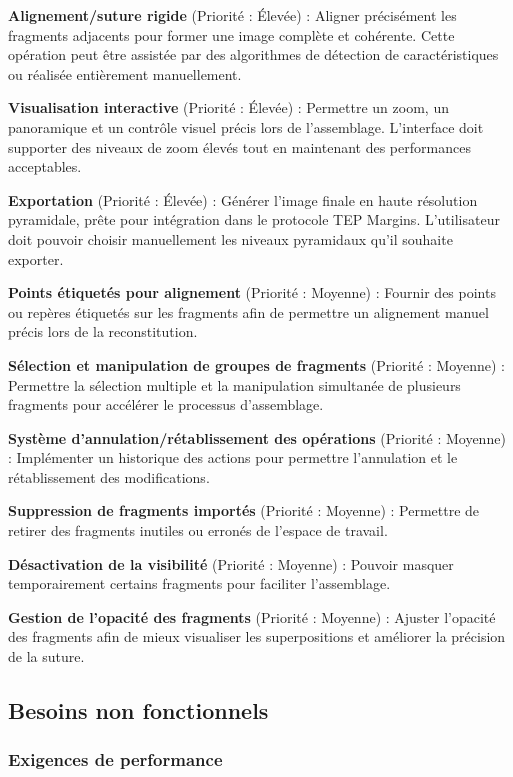 \documentclass[12pt,a4paper]{report}
\begin{document}
\textbf{Alignement/suture rigide} (Priorité : Élevée) : Aligner précisément les fragments adjacents pour former une image complète et cohérente. Cette opération peut être assistée par des algorithmes de détection de caractéristiques ou réalisée entièrement manuellement.

\textbf{Visualisation interactive} (Priorité : Élevée) : Permettre un zoom, un panoramique et un contrôle visuel précis lors de l'assemblage. L'interface doit supporter des niveaux de zoom élevés tout en maintenant des performances acceptables.

\textbf{Exportation} (Priorité : Élevée) : Générer l'image finale en haute résolution pyramidale, prête pour intégration dans le protocole TEP Margins. L'utilisateur doit pouvoir choisir manuellement les niveaux pyramidaux qu'il souhaite exporter.

\textbf{Points étiquetés pour alignement} (Priorité : Moyenne) : Fournir des points ou repères étiquetés sur les fragments afin de permettre un alignement manuel précis lors de la reconstitution.

\textbf{Sélection et manipulation de groupes de fragments} (Priorité : Moyenne) : Permettre la sélection multiple et la manipulation simultanée de plusieurs fragments pour accélérer le processus d'assemblage.

\textbf{Système d'annulation/rétablissement des opérations} (Priorité : Moyenne) : Implémenter un historique des actions pour permettre l'annulation et le rétablissement des modifications.

\textbf{Suppression de fragments importés} (Priorité : Moyenne) : Permettre de retirer des fragments inutiles ou erronés de l'espace de travail.

\textbf{Désactivation de la visibilité} (Priorité : Moyenne) : Pouvoir masquer temporairement certains fragments pour faciliter l'assemblage.

\textbf{Gestion de l'opacité des fragments} (Priorité : Moyenne) : Ajuster l'opacité des fragments afin de mieux visualiser les superpositions et améliorer la précision de la suture.

\subsection{Besoins non fonctionnels}

\subsubsection{Exigences de performance}
\end{document}
